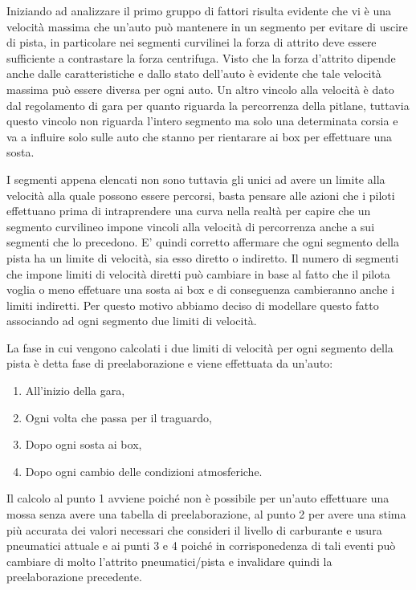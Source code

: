 \documentclass[11pt,a4paper]{report}
\begin{document}
Iniziando ad analizzare il primo gruppo di fattori risulta evidente che vi è una velocità massima che un'auto può mantenere in un segmento per evitare di uscire di pista, in particolare nei segmenti curvilinei la forza di attrito deve essere sufficiente a contrastare la forza centrifuga.
Visto che la forza d'attrito dipende anche dalle caratteristiche e dallo stato dell'auto è evidente che tale velocità massima può essere diversa per ogni auto.
Un altro vincolo alla velocità è dato dal regolamento di gara per quanto riguarda la percorrenza della pitlane, tuttavia questo vincolo non riguarda l'intero segmento ma solo una determinata corsia e va a influire solo sulle auto che stanno per rientarare ai box per effettuare una sosta.

I segmenti appena elencati non sono tuttavia gli unici ad avere un limite alla velocità alla quale possono essere percorsi, basta pensare alle azioni che i piloti effettuano prima di intraprendere una curva nella realtà per capire che un segmento curvilineo impone vincoli alla velocità di percorrenza anche a sui segmenti che lo precedono. E' quindi corretto affermare che ogni segmento della pista ha un limite di velocità, sia esso diretto o indiretto. Il numero di segmenti che impone limiti di velocità diretti può cambiare in base al fatto che il pilota voglia o meno effetuare una sosta ai box e di conseguenza cambieranno anche i limiti indiretti. Per questo motivo abbiamo deciso di modellare questo fatto associando ad ogni segmento due limiti di velocità.

La fase in cui vengono calcolati i due limiti di velocità per ogni segmento della pista è detta fase di preelaborazione e viene effettuata da un'auto:
\begin{enumerate}
\item All'inizio della gara,
\item Ogni volta che passa per il traguardo,
\item Dopo ogni sosta ai box,
\item Dopo ogni cambio delle condizioni atmosferiche.
\end{enumerate}
Il calcolo al punto 1 avviene poiché non è possibile per un'auto effettuare una mossa senza avere una tabella di preelaborazione, al punto 2 per avere una stima più accurata dei valori necessari che consideri il livello di carburante e usura pneumatici attuale e ai punti 3 e 4 poiché in corrisponedenza di tali eventi può cambiare di molto l'attrito pneumatici/pista e invalidare quindi la preelaborazione precedente.
\end{document}
